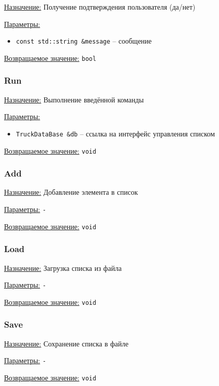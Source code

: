 \underline{Назначение:} Получение подтверждения пользователя (да/нет)

\underline{Параметры:} 

\begin{itemize}
    \item \verb|const std::string &message| -- сообщение
\end{itemize}

\underline{Возвращаемое значение:} \verb|bool|


\subsubsection*{Run}

\underline{Назначение:} Выполнение введённой команды

\underline{Параметры:} 

\begin{itemize}
    \item \verb|TruckDataBase &db| -- ссылка на интерфейс управления списком
\end{itemize}

\underline{Возвращаемое значение:} \verb|void|


\subsubsection*{Add}

\underline{Назначение:} Добавление элемента в список

\underline{Параметры:} \verb|-|

\underline{Возвращаемое значение:} \verb|void|


\subsubsection*{Load}

\underline{Назначение:} Загрузка списка из файла

\underline{Параметры:} \verb|-|

\underline{Возвращаемое значение:} \verb|void|


\subsubsection*{Save}

\underline{Назначение:} Сохранение списка в файле

\underline{Параметры:} \verb|-|

\underline{Возвращаемое значение:} \verb|void|


